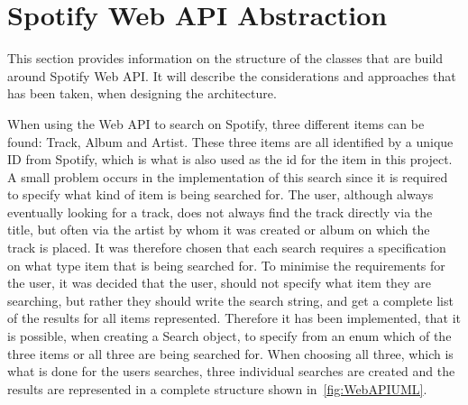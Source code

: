 \section{Spotify Web API Abstraction}
\label{imp:spotify_web_api}
This section provides information on the structure of the classes that are build around Spotify Web API. It will describe the considerations and approaches that has been taken, when designing the architecture.

When using the Web API to search on Spotify, three different items can be found: Track, Album and Artist. These three items are all identified by a unique ID from Spotify, which is what is also used as the id for the item in this project. A small problem occurs in the implementation of this search since it is required to specify what kind of item is being searched for. The user, although always eventually looking for a track, does not always find the track directly via the title, but often via the artist by whom it was created or album on which the track is placed. It was therefore chosen that each search requires a specification on what type item that is being searched for. To minimise the requirements for the user, it was decided that the user, should not specify what item they are searching, but rather they should write the search string, and get a complete list of the results for all items represented. Therefore it has been implemented, that it is possible, when creating a Search object, to specify from an enum which of the three items or all three are being searched for. When choosing all three, which is what is done for the users searches, three individual searches are created and the results are represented in a complete structure shown in~\cref{fig:WebAPIUML}.

